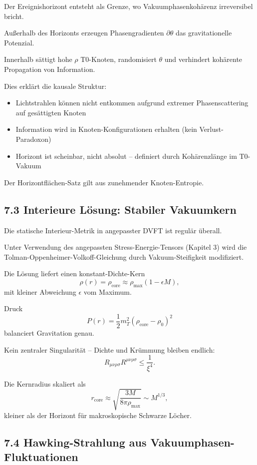 \documentclass[12pt,a4paper]{article}
\begin{document}
	Der Ereignishorizont entsteht als Grenze, wo Vakuumphasenkohärenz irreversibel bricht.
	
	Außerhalb des Horizonts erzeugen Phasengradienten $\partial \theta$ das gravitationelle Potenzial.
	
	Innerhalb sättigt hohe $\rho$ T0-Knoten, randomisiert $\theta$ und verhindert kohärente Propagation von Information.
	
	Dies erklärt die kausale Struktur:
	\begin{itemize}
		\item Lichtstrahlen können nicht entkommen aufgrund extremer Phasenscattering auf gesättigten Knoten
		\item Information wird in Knoten-Konfigurationen erhalten (kein Verlust-Paradoxon)
		\item Horizont ist scheinbar, nicht absolut – definiert durch Kohärenzlänge im T0-Vakuum
	\end{itemize}
	
	Der Horizontflächen-Satz gilt aus zunehmender Knoten-Entropie.
	
	\subsection{7.3 Interieure Lösung: Stabiler Vakuumkern}
	
	Die statische Interieur-Metrik in angepasster DVFT ist regulär überall.
	
	Unter Verwendung des angepassten Stress-Energie-Tensors (Kapitel 3) wird die Tolman-Oppenheimer-Volkoff-Gleichung durch Vakuum-Steifigkeit modifiziert.
	
	Die Lösung liefert einen konstant-Dichte-Kern
	\[
	\rho(r) = \rho_{\text{core}} \approx \rho_{\text{max}} (1 - \epsilon M),
	\]
	mit kleiner Abweichung $\epsilon$ vom Maximum.
	
	Druck
	\[
	P(r) = \frac{1}{2} m_T^2 (\rho_{\text{core}} - \rho_0)^2
	\]
	balanciert Gravitation genau.
	
	Kein zentraler Singularität – Dichte und Krümmung bleiben endlich:
	\[
	R_{\mu\nu\rho\sigma} R^{\mu\nu\rho\sigma} \leq \frac{1}{\xi^4}.
	\]
	
	Die Kernradius skaliert als
	\[
	r_{\text{core}} \approx \sqrt{\frac{3M}{8\pi \rho_{\text{max}}}} \sim M^{1/3},
	\]
	kleiner als der Horizont für makroskopische Schwarze Löcher.
	
	\subsection{7.4 Hawking-Strahlung aus Vakuumphasen-Fluktuationen}
	
\end{document}
